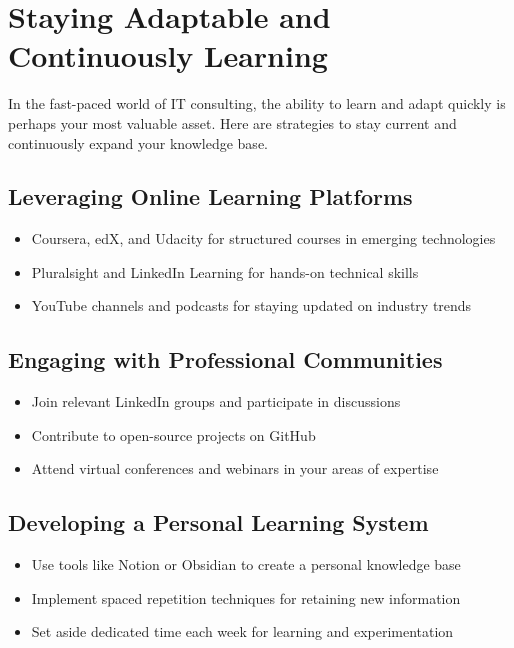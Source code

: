 \section{Staying Adaptable and Continuously Learning}

In the fast-paced world of IT consulting, the ability to learn and adapt quickly is perhaps your most valuable asset. Here are strategies to stay current and continuously expand your knowledge base.

\subsection{Leveraging Online Learning Platforms}

\begin{itemize}
    \item Coursera, edX, and Udacity for structured courses in emerging technologies
    \item Pluralsight and LinkedIn Learning for hands-on technical skills
    \item YouTube channels and podcasts for staying updated on industry trends
\end{itemize}

\subsection{Engaging with Professional Communities}

\begin{itemize}
    \item Join relevant LinkedIn groups and participate in discussions
    \item Contribute to open-source projects on GitHub
    \item Attend virtual conferences and webinars in your areas of expertise
\end{itemize}

\subsection{Developing a Personal Learning System}

\begin{itemize}
    \item Use tools like Notion or Obsidian to create a personal knowledge base
    \item Implement spaced repetition techniques for retaining new information
    \item Set aside dedicated time each week for learning and experimentation
\end{itemize}

